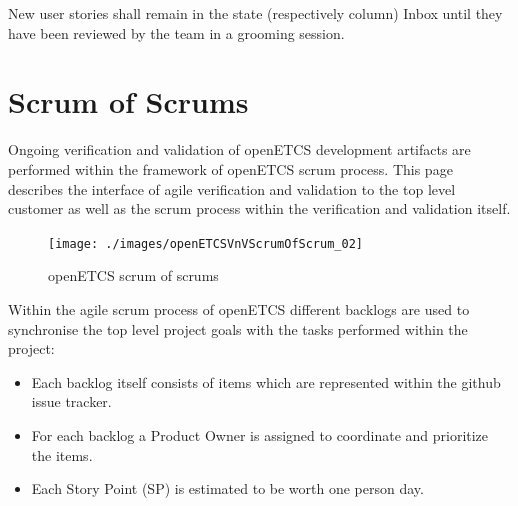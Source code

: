 New user stories shall remain in the state (respectively column) Inbox until they have been reviewed by the team in a grooming session. 

\section{Scrum of Scrums}

Ongoing verification and validation of openETCS development artifacts are performed within the framework of openETCS scrum process. This page describes the interface of agile verification and validation to the top level customer as well as the scrum process within the verification and validation itself.

\begin{figure}[h]
\centering
\texttt{[image: ./images/openETCSVnVScrumOfScrum\_02]}
\caption{openETCS scrum of scrums}
\label{fig:openETCSVnVScrumOfScrum}
\end{figure}

Within the agile scrum process of openETCS different backlogs are used to synchronise the top level project goals with the tasks performed within the project: 

\begin{itemize}
\item Each backlog itself consists of items which are represented within the github issue tracker. 
\item For each backlog a Product Owner is assigned to coordinate and prioritize the items.
\item Each Story Point (SP) is estimated to be worth one person day.
\end{itemize}


